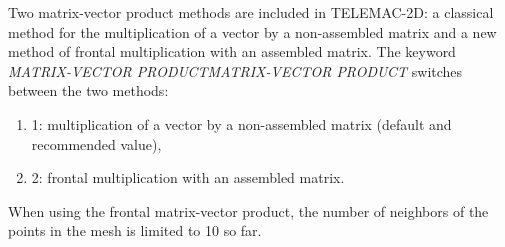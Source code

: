  Two matrix-vector product methods are included in TELEMAC-2D: a classical method for the multiplication of a vector by a non-assembled matrix and a new method of frontal multiplication with an assembled matrix. The keyword \textit{MATRIX-VECTOR PRODUCTMATRIX-VECTOR PRODUCT}  switches between the two methods:

\begin{enumerate}
\item[\nonumber]  1: multiplication of a vector by a non-assembled matrix (default and recommended value),

\item[\nonumber]  2: frontal multiplication with an assembled matrix.
\end{enumerate}

 When using the frontal matrix-vector product, the number of neighbors of the points in the mesh is limited to 10 so far.


